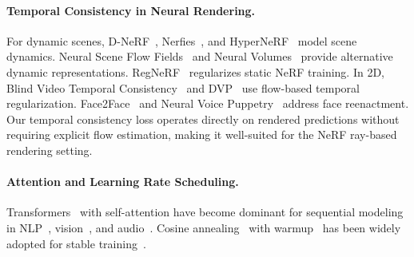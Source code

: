 \documentclass[10pt,twocolumn,letterpaper]{article}
\begin{document}
\paragraph{Temporal Consistency in Neural Rendering.}
For dynamic scenes, D-NeRF~\cite{pumarola2021dnerf}, Nerfies~\cite{park2021nerfies}, and HyperNeRF~\cite{park2021hypernerf} model scene dynamics.
Neural Scene Flow Fields~\cite{li2021nsff} and Neural Volumes~\cite{lombardi2019neural} provide alternative dynamic representations.
RegNeRF~\cite{regnerf2022} regularizes static NeRF training.
In 2D, Blind Video Temporal Consistency~\cite{lai2018blind} and DVP~\cite{kim2019dvp} use flow-based temporal regularization.
Face2Face~\cite{thies2016face2face} and Neural Voice Puppetry~\cite{thies2020nvp} address face reenactment.
Our temporal consistency loss operates directly on rendered predictions without requiring explicit flow estimation, making it well-suited for the NeRF ray-based rendering setting.

\paragraph{Attention and Learning Rate Scheduling.}
Transformers~\cite{vaswani2017attention} with self-attention have become dominant for sequential modeling in NLP~\cite{devlin2019bert}, vision~\cite{dosovitskiy2020vit}, and audio~\cite{baevski2020wav2vec}.
Cosine annealing~\cite{loshchilov2017sgdr} with warmup~\cite{goyal2017accurate} has been widely adopted for stable training~\cite{he2016resnet,loshchilov2019adamw,smith2019super}.


\end{document}
